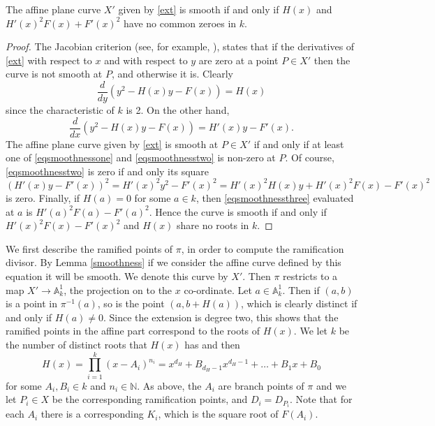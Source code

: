     \begin{lem}\label{smoothness}
    The affine plane curve $X'$ given by \eqref{ext} is smooth if and only if $H(x)$ and $H'(x)^2 F(x) + F'(x)^2$ have no common zeroes in $k$.
    \end{lem}
    \begin{proof}
    The Jacobian criterion (see, for example, \cite[Thm. 4.2.19]{liu}), states that if the derivatives of \eqref{ext} with respect to $x$ and with respect to $y$ are zero at a point $P\in X'$ then the curve is not smooth at $P$, and otherwise it is.
    Clearly
        \begin{equation}\label{eqsmoothnessone}
        \frac{d}{dy} (y^2 -H(x)y -F(x)) = H(x)
        \end{equation}
    since the characteristic of $k$ is 2.
    On the other hand,
        \begin{equation}\label{eqsmoothnesstwo}
        \frac{d}{dx} (y^2 - H(x)y -F(x)) = H'(x)y - F'(x).
        \end{equation}
    The affine plane curve given by \eqref{ext} is smooth at $P\in X'$ if and only if at least one of \eqref{eqsmoothnessone} and \eqref{eqsmoothnesstwo} is non-zero at $P$.
    Of course, \eqref{eqsmoothnesstwo} is zero if and only its square
        \begin{equation}\label{eqsmoothnessthree}
        (H'(x)y-F'(x))^2 = H'(x)^2y^2 -F'(x)^2 = H'(x)^2H(x)y + H'(x)^2F(x) - F'(x)^2
        \end{equation}
    is zero.
    Finally, if $H(a) = 0$ for some $a \in k$, then \eqref{eqsmoothnessthree} evaluated at $a$ is $H'(a)^2F(a) - F'(a)^2$.
    Hence the curve is smooth if and only if $H'(x)^2F(x) - F'(x)^2$ and $H(x)$ share no roots in $k$.
    \end{proof}

We first describe the ramified points of $\pi$, in order to compute the ramification divisor.
By Lemma \ref{smoothness} if we consider the affine curve defined by this equation it will be smooth.
We denote this curve by $X'$.
Then $\pi$ restricts to a map $X'\rightarrow \mathbb A^1_k$, the projection on to the $x$ co-ordinate.
Let $a\in \mathbb A_k^1$.
Then if $(a,b)$ is a point in $\pi^{-1}(a)$, so is the point $(a,b+H(a))$, which is clearly distinct if and only if $H(a)\neq 0$.
Since the extension is degree two, this shows that the ramified points in the affine part correspond to the roots of $H(x)$.
We let $k$ be the number of distinct roots that $H(x)$ has and then 
    \begin{equation}\label{equationcapitalh}
    H(x) = \prod_{i=1}^{k} (x-A_i)^{n_i} = x^{d_H} + B_{{d_H}-1}x^{{d_H}-1} + \ldots + B_1x + B_0
    \end{equation}
for some $A_i, B_i \in  k$ and $n_i \in \mathbb N$.
As above, the $A_i$ are branch points of $\pi$ and we let $P_i \in X$ be the corresponding ramification points, and $D_i = D_{P_i}$.
Note that for each $A_i$ there is a corresponding $K_i$, which is the square root of $F(A_i)$.

